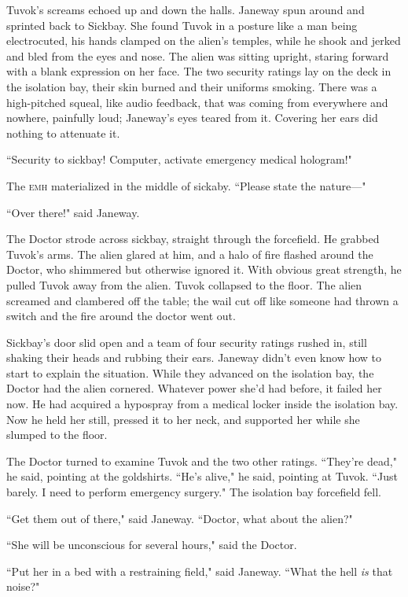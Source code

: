 \documentclass[twoside,letterpaper,12pt]{memoir}
\begin{document}
Tuvok's screams echoed up and down the halls. Janeway spun around and sprinted back to Sickbay. She found Tuvok in a posture like a man being electrocuted, his hands clamped on the alien's temples, while he shook and jerked and bled from the eyes and nose. The alien was sitting upright, staring forward with a blank expression on her face. The two security ratings lay on the deck in the isolation bay, their skin burned and their uniforms smoking. There was a high-pitched squeal, like audio feedback, that was coming from everywhere and nowhere, painfully loud; Janeway's eyes teared from it. Covering her ears did nothing to attenuate it. 

``Security to sickbay! Computer, activate emergency medical hologram!" 

The \textsc{emh} materialized in the middle of sickaby. ``Please state the nature---" 

``Over there!" said Janeway. 

The Doctor strode across sickbay, straight through the forcefield. He grabbed Tuvok's arms. The alien glared at him, and a halo of fire flashed around the Doctor, who shimmered but otherwise ignored it. With obvious great strength, he pulled Tuvok away from the alien. Tuvok collapsed to the floor. The alien screamed and clambered off the table; the wail cut off like someone had thrown a switch and the fire around the doctor went out. 

Sickbay's door slid open and a team of four security ratings rushed in, still shaking their heads and rubbing their ears. Janeway didn't even know how to start to explain the situation. While they advanced on the isolation bay, the Doctor had the alien cornered. Whatever power she'd had before, it failed her now. He had acquired a hypospray from a medical locker inside the isolation bay. Now he held her still, pressed it to her neck, and supported her while she slumped to the floor. 

The Doctor turned to examine Tuvok and the two other ratings. ``They're dead," he said, pointing at the goldshirts. ``He's alive," he said, pointing at Tuvok. ``Just barely. I need to perform emergency surgery." The isolation bay forcefield fell. 

``Get them out of there," said Janeway. ``Doctor, what about the alien?" 

``She will be unconscious for several hours," said the Doctor. 

``Put her in a bed with a restraining field," said Janeway. ``What the hell \textit{is} that noise?" 
\end{document}
